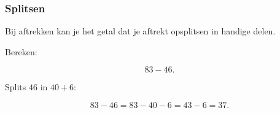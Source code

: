 \documentclass{ximera}
\begin{document}

\subsubsection*{Splitsen}

Bij aftrekken kan je het getal dat je aftrekt opsplitsen in handige delen.

\begin{voorbeeld}

Bereken:

\[
83-46.
\]

Splits \(46\) in \(40+6\):

\[
83-46
=
83-40-6
=
43-6
=
37.
\]

\end{voorbeeld}
\end{document}
